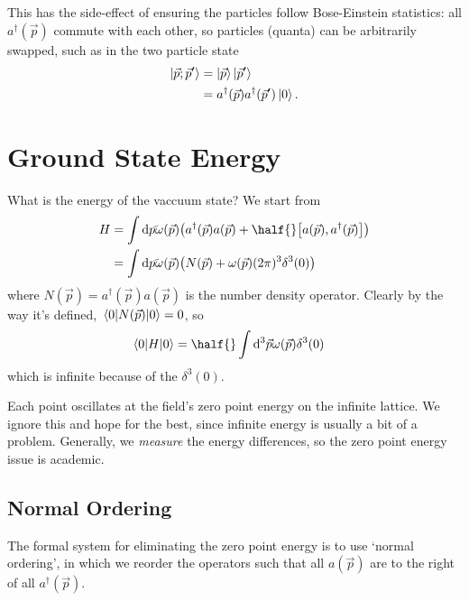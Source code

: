 \documentclass[notes.tex]{subfiles}
\begin{document}
This has the side-effect of ensuring the particles follow Bose-Einstein statistics: all $a^\dagger(\vec{p})$ commute with each other, so particles (quanta) can be arbitrarily swapped, such as in the two particle state 
\begin{align*}
    \ket{\vec{p}; \vec{p}^\prime} &= \ket{\vec{p}}\ket{\vec{p}^\prime}\\
    &= a^\dagger(\vec{p}) a^\dagger(\vec{p}^\prime)\ket{0}.
\end{align*}

\section{Ground State Energy}
What is the energy of the vaccuum state? We start from
\begin{align*}
    H &= \int\dds{p} \omega(\vec{p})\qty(a^\dagger(\vec{p}) a(\vec{p}) + \half{}\commutator{a(\vec{p})}{a^\dagger(\vec{p})})\\
    &= \int \dds{p}\omega(\vec{p})\qty(N(\vec{p}) + \omega(\vec{p})(2\pi)^3 \delta^3(0))
\end{align*}
where $N(\vec{p})=a^\dagger(\vec{p}) a(\vec{p})$ is the number density operator. 
Clearly by the way it's defined, $\mel{0}{N(\vec{p})}{0} = 0$, so 
\begin{align*}
    \mel{0}{H}{0} &= \half{}\int\dd[3]\vec{p} \omega(\vec{p}) \delta^3(0)
\end{align*}
which is infinite because of the $\delta^3(0)$.

Each point oscillates at the field's zero point energy on the infinite lattice. We ignore this and hope for the best, since infinite energy is usually a bit of a problem. Generally, we \emph{measure} the energy differences, so the zero point energy issue is academic.

\subsection{Normal Ordering}
The formal system for eliminating the zero point energy is to use `normal ordering', in which we reorder the operators such that all $a(\vec{p})$ are to the right of all $a^\dagger(\vec{p})$. 
\end{document}
